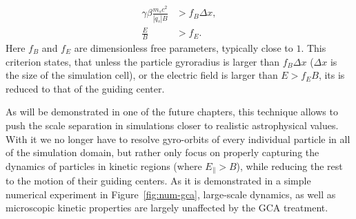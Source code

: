\begin{equation}
    \begin{aligned}
        \gamma\beta \frac{m_s c^2}{|q_s| B} &> f_B \Delta x,\\
        \frac{E}{B} &> f_E.
    \end{aligned}
\end{equation}
\noindent Here $f_B$ and $f_E$ are dimensionless free parameters, typically close to $1$. This criterion states, that unless the particle gyroradius is larger than $f_B\Delta x$ ($\Delta x$ is the size of the simulation cell), or the electric field is larger than $E>f_E B$, its is reduced to that of the guiding center.

As will be demonstrated in one of the future chapters, this technique allows to push the scale separation in simulations closer to realistic astrophysical values. With it we no longer have to resolve gyro-orbits of every individual particle in all of the simulation domain, but rather only focus on properly capturing the dynamics of particles in kinetic regions (where $E_\parallel>B$), while reducing the rest to the motion of their guiding centers. As it is demonstrated in a simple numerical experiment in Figure~\ref{fig:num-gca}, large-scale dynamics, as well as microscopic kinetic properties are largely unaffected by the GCA treatment. 

